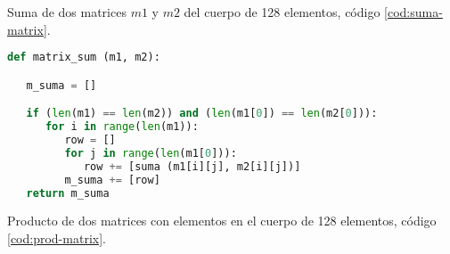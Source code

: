 Suma de dos matrices $m1$ y $m2$ del cuerpo de 128 elementos, código \ref{cod:suma-matrix}.

\begin{table}[H]
	\begin{center}
	\centering
	\end{center}
	\caption{Parámetros de la función \texttt{matrix\_sum}}
\end{table}

\vspace{0.25cm}

\begin{lstlisting}[language=Python,caption=Suma de dos matrices con elementos en el cuerpo, label=cod:suma-matrix]
def matrix_sum (m1, m2):

   m_suma = []

   if (len(m1) == len(m2)) and (len(m1[0]) == len(m2[0])):
      for i in range(len(m1)):
         row = []
         for j in range(len(m1[0])):
            row += [suma (m1[i][j], m2[i][j])]
         m_suma += [row]
   return m_suma
\end{lstlisting}


Producto de dos matrices con elementos en el cuerpo de 128 elementos, código \ref{cod:prod-matrix}.

